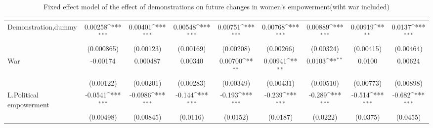 \begin{table}[htbp]\centering
\def\sym#1{\ifmmode^{#1}\else\(^{#1}\)\fi}
\caption{Fixed effect model of the effect of demonstrations on future changes in women's empowerment(wiht war included) \label{polemdemonstrationwar}}
\begin{tabular}{l*{8}{c}}
\hline\hline
                    &&&&&&&&\\
\hline
Demonstration,dummy &     0.00258\sym{***}&     0.00401\sym{***}&     0.00548\sym{***}&     0.00751\sym{***}&     0.00768\sym{***}&     0.00889\sym{***}&     0.00919\sym{**} &      0.0137\sym{***}\\
                    &  (0.000865)         &   (0.00123)         &   (0.00169)         &   (0.00208)         &   (0.00266)         &   (0.00324)         &   (0.00415)         &   (0.00464)         \\
[1em]
War                 &    -0.00174         &    0.000487         &     0.00340         &     0.00700\sym{**} &     0.00941\sym{**} &      0.0103\sym{**} &      0.0100         &     0.00624         \\
                    &   (0.00122)         &   (0.00201)         &   (0.00283)         &   (0.00349)         &   (0.00431)         &   (0.00510)         &   (0.00773)         &   (0.00898)         \\
[1em]
L.Political empowerment&     -0.0541\sym{***}&     -0.0986\sym{***}&      -0.144\sym{***}&      -0.193\sym{***}&      -0.239\sym{***}&      -0.289\sym{***}&      -0.514\sym{***}&      -0.682\sym{***}\\
                    &   (0.00498)         &   (0.00845)         &    (0.0116)         &    (0.0152)         &    (0.0187)         &    (0.0222)         &    (0.0375)         &    (0.0455)         \\

\end{tabular}
\end{table}
